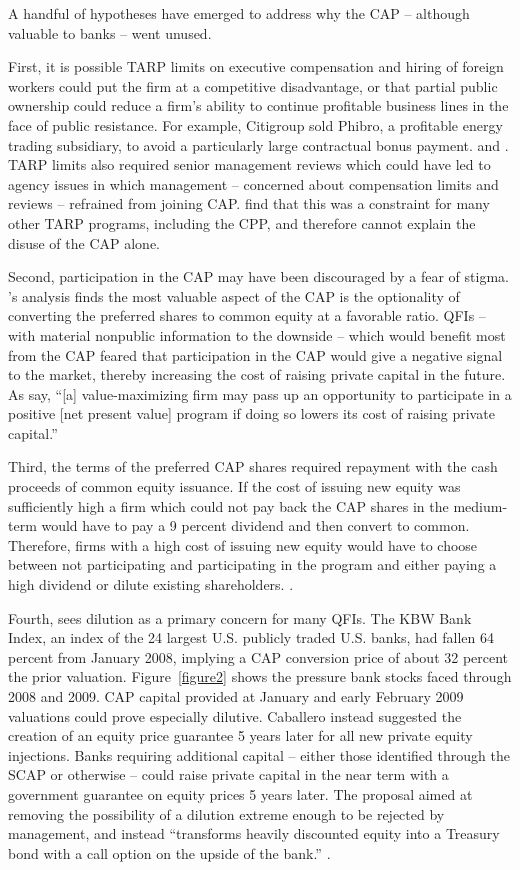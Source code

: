 \documentclass[12pt]{article}
\begin{document}
A handful of hypotheses have emerged to address why the CAP -- although valuable to banks -- went unused.

First, it is possible TARP limits on executive compensation and hiring of foreign workers could put the firm at a competitive disadvantage, or that partial public ownership could reduce a firm's ability to continue profitable business lines in the face of public resistance. For example, Citigroup sold Phibro, a profitable energy trading subsidiary, to avoid a particularly large contractual bonus payment. \citep{GW} and \citep{Dash}. TARP limits also required senior management reviews which could have led to agency issues in which management -- concerned about compensation limits and reviews -- refrained from joining CAP. \citet{GW} find that this was a constraint for many other TARP programs, including the CPP, and therefore cannot explain the disuse of the CAP alone.

Second, participation in the CAP may have been discouraged by a fear of stigma. \citet{GW}'s analysis finds the most valuable aspect of the CAP is the optionality of converting the preferred shares to common equity at a favorable ratio. QFIs -- with material nonpublic information to the downside -- which would benefit most from the CAP feared that participation in the CAP would give a negative signal to the market, thereby increasing the cost of raising private capital in the future. As \citet{GW} say, ``[a] value-maximizing firm may pass up an opportunity to participate in a positive [net present value] program if doing so lowers its cost of raising private capital.''

Third, the terms of the preferred CAP shares required repayment with the cash proceeds of common equity issuance. If the cost of issuing new equity was sufficiently high a firm which could not pay back the CAP shares in the medium-term would have to pay a 9 percent dividend and then convert to common. Therefore, firms with a high cost of issuing new equity would have to choose between not participating and participating in the program and either paying a high dividend or dilute existing shareholders. \citep{GW}.  

Fourth, \citet{Caballero} sees dilution as a primary concern for many QFIs. The KBW Bank Index, an index of the 24 largest U.S. publicly traded U.S. banks, had fallen 64 percent from January 2008, implying a CAP conversion price of about 32 percent the prior valuation. Figure~\ref{figure2} shows the pressure bank stocks faced through 2008 and 2009. CAP capital provided at January and early February 2009 valuations could prove especially dilutive. Caballero instead suggested the creation of an equity price guarantee 5 years later for all new private equity injections. Banks requiring additional capital -- either those identified through the SCAP or otherwise -- could raise private capital in the near term with a government guarantee on equity prices 5 years later. The proposal aimed at removing the possibility of a dilution extreme enough to be rejected by management, and instead ``transforms heavily discounted equity into a Treasury bond with a call option on the upside of the bank.'' \citep{Caballero}.
\end{document}
